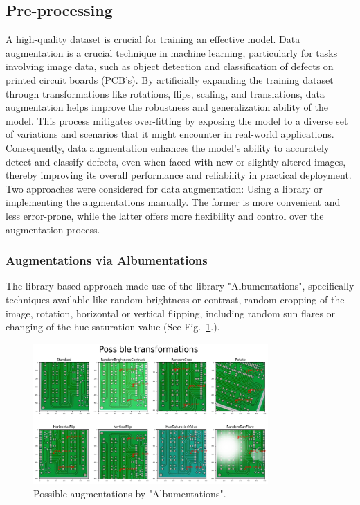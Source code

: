 \documentclass[12pt]{article}
\begin{document}
\subsection{Pre-processing}
A high-quality dataset is crucial for training an effective model. Data augmentation is a crucial technique in machine learning, 
particularly for tasks involving image data, such as object detection and classification of defects on printed circuit boards (PCB's). 
By artificially expanding the training dataset through transformations like rotations, flips, scaling, and translations, data augmentation 
helps improve the robustness and generalization ability of the model\cite{Cubuk2020AutoAugment}. This process mitigates over-fitting by exposing the model to a diverse 
set of variations and scenarios that it might encounter in real-world applications. Consequently, data augmentation enhances the model's 
ability to accurately detect and classify defects, even when faced with new or slightly altered images, thereby improving its overall 
performance and reliability in practical deployment\cite{Cubuk2020AutoAugment}.
Two approaches were considered for data augmentation: Using a library or implementing the augmentations manually. The former is more convenient and less error-prone, while the latter offers more flexibility and control over the augmentation process. 

\subsubsection{Augmentations via Albumentations}

The library-based approach made use of the library "Albumentations"\cite{AlbumentationsDocs}, specifically techniques available like random brightness or contrast, random cropping of the image, rotation, horizontal or vertical flipping, including random sun flares or changing of the hue saturation value (See Fig.~\ref{fig:Albumentations}.).

\begin{figure}[h]
    \centering
    \includegraphics[width=0.8\textwidth]{./graphics/5.png}
    \caption{Possible augmentations by "Albumentations".}
    \label{fig:Albumentations}
\end{figure}
\end{document}
